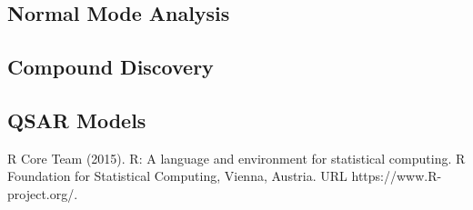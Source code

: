 
\begin{thebibliography}{00}

\subsection{Normal Mode Analysis} 

\subsection{Compound Discovery} 

\subsection{QSAR Models}

R Core Team (2015). 
\newblock R: A language and environment for statistical computing. R Foundation for Statistical Computing, Vienna, Austria.
\newblock URL https://www.R-project.org/.

\end{thebibliography}


